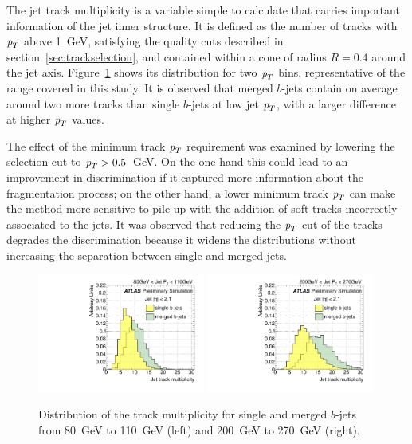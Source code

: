 The jet track multiplicity is a variable simple to calculate that carries important information of the jet inner structure. It is defined as the number of tracks with ${\emph{p}_{T}}$ above 1~GeV, satisfying the quality cuts described in section~\ref{sec:trackselection}, and contained within a cone of radius $R=0.4$ around the jet axis.  Figure~\ref{fig:ntrksinglemerged} shows its distribution for two ${\emph{p}_{T}}$ bins, representative of the range covered in this study.  It is observed that merged $b$-jets contain on average around two more tracks than single $b$-jets at low jet ${\emph{p}_{T}}$, with a larger difference at higher ${\emph{p}_{T}}$ values. 

The effect of the minimum track ${\emph{p}_{T}}$ requirement was examined by lowering the selection cut to ${\emph{p}_{T}} > 0.5$~GeV. On the one hand this could lead to an improvement in discrimination if it captured more information about the fragmentation process; on the other hand, a lower minimum track ${\emph{p}_{T}}$ can make the method more sensitive to pile-up with the addition of soft tracks incorrectly associated to the jets.
It was observed that reducing the ${\emph{p}_{T}}$ cut of the tracks degrades the discrimination because it widens the distributions without increasing the separation between single and merged jets. 

\begin{figure}[tp]
\centering
\includegraphics[width=0.49\textwidth]{FIGS/VarsSingleMerged/Ntrk080.pdf}
\includegraphics[width=0.49\textwidth]{FIGS/VarsSingleMerged/Ntrk200.pdf}
\caption{Distribution of the track multiplicity for single and merged $b$-jets from 80~GeV to 110~GeV (left) and 200~GeV to 270~GeV (right).}
\label{fig:ntrksinglemerged}
\end{figure}


